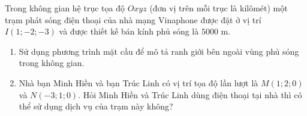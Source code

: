 \begin{bt}%
	Trong không gian hệ trục tọa độ $Oxyz$ (đơn vị trên mỗi trục là kilômét) một trạm phát sóng điện thoại của nhà mạng Vinaphone được đặt ở vị trí $I(1;-2;-3)$ và được thiết kế bán kính phủ sóng là $ 5000 $ m.
	\begin{enumerate}
		\item Sử dụng phương trình mặt cầu để mô tả ranh giới bên ngoài vùng phủ sóng trong không gian.		
		\item Nhà bạn Minh Hiền và bạn Trúc Linh có vị trí tọa độ lần lượt là $M(1;2;0)$ và $N(-3;1;0)$. Hỏi Minh Hiền và Trúc Linh dùng điện thoại tại nhà thì có thể sử dụng dịch vụ của trạm này không?
	\end{enumerate}
\end{bt}